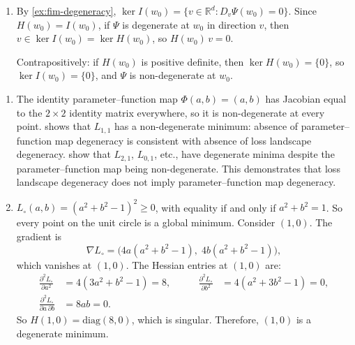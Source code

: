 \documentclass[11pt]{article}
\newcommand{\R}{\mathbb{R}}
\begin{document}
\begin{solution}
\begin{enumerate}
    \item
        By \cref{ex:fim-degeneracy},
        $\ker I(w_0)
        = \{v \in \R^d : D_v \Psi(w_0) = 0\}$.
        Since $H(w_0) = I(w_0)$, if $\Psi$ is degenerate at $w_0$ in
        direction $v$, then $v \in \ker I(w_0) = \ker H(w_0)$, so
        $H(w_0)\, v = 0$.

        Contrapositively: if $H(w_0)$ is positive definite, then
        $\ker H(w_0) = \{0\}$, so $\ker I(w_0) = \{0\}$, and $\Psi$ is
        non-degenerate at $w_0$. \qedhere
\end{enumerate}
\end{solution}

\begin{solution}
\begin{enumerate}
    \item
        The identity parameter--function map $\Phi(a,b) = (a,b)$ has Jacobian
        equal to the $2 \times 2$ identity matrix everywhere, so it is
        non-degenerate at every point.
         shows that $L_{1,1}$ has a non-degenerate minimum:
        absence of parameter--function map degeneracy is consistent with
        absence of loss landscape degeneracy.
         show that $L_{2,1}$, $L_{0,1}$, etc., have
        degenerate minima despite the parameter--function map being
        non-degenerate. This demonstrates that loss landscape degeneracy does
        not imply parameter--function map degeneracy.

    \item
        $L_\circ(a,b) = (a^2 + b^2 - 1)^2 \geq 0$, with equality if and only
        if $a^2 + b^2 = 1$. So every point on the unit circle is a global
        minimum. Consider $(1, 0)$. The gradient is
        \begin{equation*}
            \nabla L_\circ
            = \bigl(4a(a^2 + b^2 - 1),\; 4b(a^2 + b^2 - 1)\bigr),
        \end{equation*}
        which vanishes at $(1, 0)$. The Hessian entries at $(1, 0)$ are:
        \begin{align*}
            \frac{\partial^2 L_\circ}{\partial a^2}
            &= 4(3a^2 + b^2 - 1) = 8,
        &\qquad
            \frac{\partial^2 L_\circ}{\partial b^2}
            &= 4(a^2 + 3b^2 - 1) = 0,
        \\
            \frac{\partial^2 L_\circ}{\partial a\, \partial b}
            &= 8ab = 0.
        \end{align*}
        So $H(1,0) = \mathrm{diag}(8, 0)$, which is singular. Therefore, $(1,0)$
        is a degenerate minimum.


\end{enumerate}
\end{solution}
\end{document}
